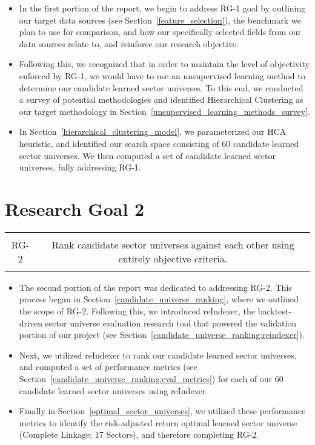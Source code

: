 \documentclass[../main.tex]{subfiles}
\begin{document}
\begin{itemize}
    \item In the first portion of the report, we begin to address RG-1 goal by outlining our target data sources (see Section~\ref{feature_selection}), the benchmark we plan to use for comparison, and how our specifically selected fields from our data sources relate to, and reinforce our research objective.
    \item Following this, we recognized that in order to maintain the level of objectivity enforced by RG-1, we would have to use an unsupervised learning method to determine our candidate learned sector universes. To this end, we conducted a survey of potential methodologies and identified Hierarchical Clustering as our target methodology in Section~\ref{unsupervised_learning_methods_survey}.
    \item In Section~\ref{hierarchical_clustering_model}, we parameterized our HCA heuristic, and identified our search space consisting of 60 candidate learned sector universes. We then computed a set of candidate learned sector universes, fully addressing RG-1.
\end{itemize}


\section{Research Goal 2}

\begin{table}[h!]
    \centering
    \begin{tabular}{| c | c |}
        \hline
        &  \\
        RG-2 & Rank candidate sector universes against each other using entirely objective criteria. \\
        & \\
        \hline
    \end{tabular}
\end{table}

\begin{itemize}
    \item The second portion of the report was dedicated to addressing RG-2. This process began in Section~\ref{candidate_universe_ranking}, where we outlined the scope of RG-2. Following this, we introduced reIndexer, the backtest-driven sector universe evaluation research tool that powered the validation portion of our project (see Section~\ref{candidate_universe_ranking:reindexer}).
    \item Next, we utilized reIndexer to rank our candidate learned sector universes, and computed a set of performance metrics (see Section~\ref{candidate_universe_ranking:eval_metrics}) for each of our 60 candidate learned sector universes using reIndexer.
    \item Finally in Section~\ref{optimal_sector_universes}, we utilized these performance metrics to identify the risk-adjusted return optimal learned sector universe (Complete Linkage; 17 Sectors), and therefore completing RG-2.
\end{itemize}
\end{document}
